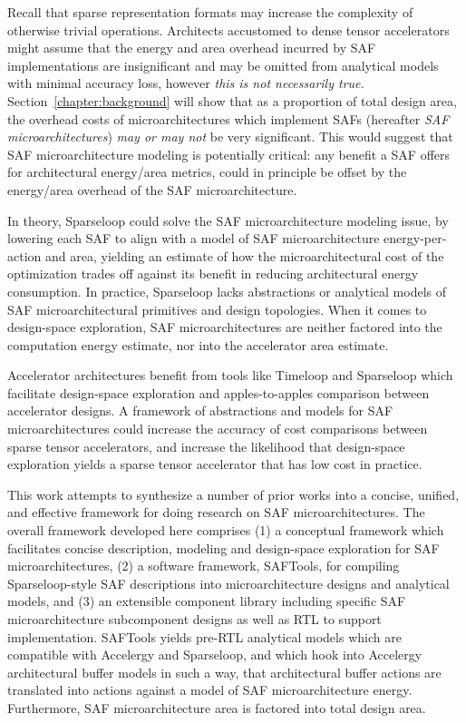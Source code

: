 Recall that sparse representation formats may increase the complexity of otherwise trivial operations. Architects accustomed to dense tensor accelerators might assume that the energy and area overhead incurred by SAF implementations are insignificant and may be omitted from analytical models with minimal accuracy loss, however \textit{this is not necessarily true.} Section~\ref{chapter:background} will show that as a proportion of total design area, the overhead costs of microarchitectures which implement SAFs (hereafter \textit{SAF microarchitectures}) \textit{may or may not} be very significant. This would suggest that SAF microarchitecture modeling is potentially critical: any benefit a SAF offers for architectural energy/area metrics, could in principle be offset by the energy/area overhead of the SAF microarchitecture.

In theory, Sparseloop could solve the SAF microarchitecture modeling issue, by lowering each SAF to align with a model of SAF microarchitecture energy-per-action and area, yielding an estimate of how the microarchitectural cost of the optimization trades off against its benefit in reducing architectural energy consumption. In practice, Sparseloop lacks abstractions or analytical models of SAF microarchitectural primitives and design topologies. When it comes to design-space exploration, SAF microarchitectures are neither factored into the computation energy estimate, nor into the accelerator area estimate.

Accelerator architectures benefit from tools like Timeloop and Sparseloop which facilitate design-space exploration and apples-to-apples comparison between accelerator designs. A framework of abstractions and models for SAF microarchitectures could increase the accuracy of cost comparisons between sparse tensor accelerators, and increase the likelihood that design-space exploration yields a sparse tensor accelerator that has low cost in practice.

This work attempts to synthesize a number of prior works into a concise, unified, and effective framework for doing research on SAF microarchitectures. The overall framework developed here comprises (1) a conceptual framework which facilitates concise description, modeling and design-space exploration for SAF microarchitectures, (2) a software framework, SAFTools, for compiling Sparseloop-style SAF descriptions into microarchitecture designs and analytical models, and (3) an extensible component library including specific SAF microarchitecture subcomponent designs as well as RTL to support implementation. SAFTools yields pre-RTL analytical models which are compatible with Accelergy and Sparseloop, and which hook into Accelergy architectural buffer models in such a way, that architectural buffer actions are translated into actions against a model of SAF microarchitecture energy. Furthermore, SAF microarchitecture area is factored into total design area. 

